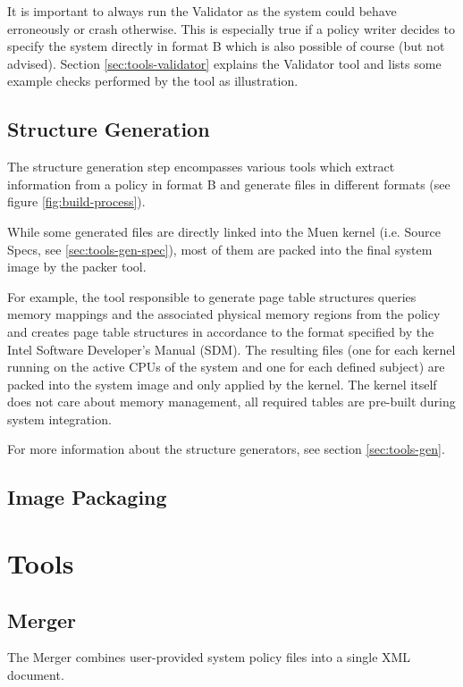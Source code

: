 \documentclass[a4paper,twoside,titlepage]{article}
\begin{document}
It is important to always run the Validator as the system could behave
erroneously or crash otherwise. This is especially true if a policy writer
decides to specify the system directly in format B which is also possible of
course (but not advised).  Section \ref{sec:tools-validator} explains the
Validator tool and lists some example checks performed by the tool as
illustration.

\subsection{Structure Generation}
The structure generation step encompasses various tools which extract
information from a policy in format B and generate files in different formats
(see figure \ref{fig:build-process}).

While some generated files are directly linked into the Muen kernel (i.e.
Source Specs, see \ref{sec:tools-gen-spec}), most of them are packed into the
final system image by the packer tool.

For example, the tool responsible to generate page table structures queries
memory mappings and the associated physical memory regions from the policy and
creates page table structures in accordance to the format specified by the Intel
Software Developer's Manual (SDM). The resulting files (one for each kernel
running on the active CPUs of the system and one for each defined subject) are
packed into the system image and only applied by the kernel. The kernel itself
does not care about memory management, all required tables are pre-built during
system integration.

For more information about the structure generators, see section
\ref{sec:tools-gen}.

\subsection{Image Packaging}

\section{Tools}
\label{sec:tools}

\subsection{Merger}
\label{sec:tools-merger}
The Merger combines user-provided system policy files into a single XML
document.
\end{document}
